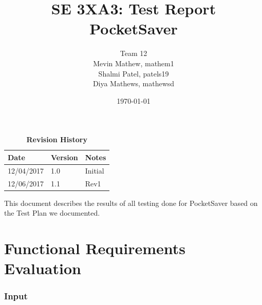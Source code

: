 \documentclass[12pt, titlepage]{article}
\title{SE 3XA3: Test Report\\PocketSaver}
\author{Team 12
		\\ Mevin Mathew, mathem1
		\\ Shalmi Patel, patels19
		\\ Diya Mathews, mathewsd
}
\date{\today}
\begin{document}
\maketitle

\tableofcontents
\listoftables
\listoffigures

\begin{table}[bp]
\caption{\bf Revision History}
\begin{tabularx}{\textwidth}{p{3cm}p{2cm}X}
\toprule {\bf Date} & {\bf Version} & {\bf Notes}\\
\midrule
12/04/2017 & 1.0 & Initial\\
12/06/2017 & 1.1 & Rev1\\
\bottomrule
\end{tabularx}
\end{table}

\newpage


This document describes the results of all testing done for PocketSaver based on the Test Plan we documented.

\section{Functional Requirements Evaluation}
\subsubsection{Input}
\end{document}
